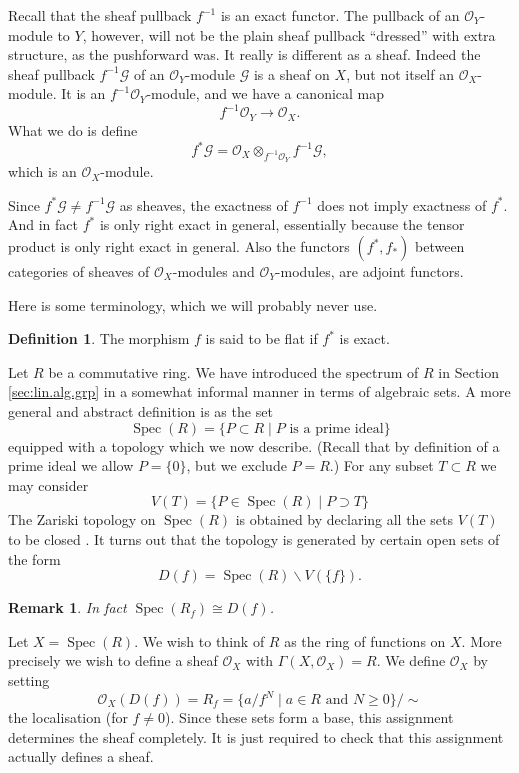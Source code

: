\documentclass[12pt]{article}
\theoremstyle{plain}
\newtheorem{rem}[thm]{Remark}
\theoremstyle{definition}
\newtheorem{defn}{Definition}[section]
\numberwithin{equation}{section}
\DeclareMathOperator{\spec}{Spec}
\newcommand{\CG}{\mathcal{G}}
\newcommand{\OO}{\mathcal{O}}
\begin{document}
Recall that the sheaf pullback $f^{-1}$ is an exact functor. The pullback of an $\OO_Y$-module to $Y$, however, will not be the plain sheaf pullback ``dressed'' with extra structure, as the pushforward was. It really is different as a sheaf. Indeed the sheaf pullback $f^{-1}\CG$ of an $\OO_Y$-module $\CG$ is a sheaf on $X$, but not itself an $\OO_X$-module. It is an $f^{-1}\OO_Y$-module, and we have a canonical map
\[
f^{-1}\OO_Y \rightarrow \OO_X.
\]
What we do is define
\[
f^*\CG = \OO_X \otimes_{f^{-1}\OO_Y} f^{-1}\CG,
\]
which is an $\OO_X$-module.

Since $f^*\CG \neq f^{-1}\CG$ as sheaves, the exactness of $f^{-1}$ does not imply exactness of $f^*$. And in fact $f^*$ is only right exact in general, essentially because the tensor product is only right exact in general. Also the functors $(f^*, f_*)$ between categories of sheaves of $\OO_X$-modules and $\OO_Y$-modules, are adjoint functors.

Here is some terminology, which we will probably never use.
\begin{defn}
The morphism $f$ is said to be flat if $f^*$ is exact.
\end{defn}


Let $R$ be a commutative ring. We have introduced the spectrum of $R$ in Section \ref{sec:lin.alg.grp} in a somewhat informal manner in terms of algebraic sets. A more general and abstract definition is as the set
\[
\spec(R) = \{P \subset R \mid \text{$P$ is a prime ideal}\}
\]
equipped with a topology which we now describe. (Recall that by definition of a prime ideal we allow $P = \{0\}$, but we exclude $P = R$.) For any subset $T \subset R$ we may consider
\[
V(T) = \{P \in \spec(R) \mid \text{$P \supset T$}\}
\]
The Zariski topology on $\spec(R)$ is obtained by declaring all the sets $V(T)$ to be closed {\cite[10.17]{stacks-project}}. It turns out that the topology is generated by certain open sets of the form
\[
D(f) = \spec(R) \backslash V(\{f\}).
\]
\begin{rem}
In fact $\spec(R_f) \cong D(f)$.
\end{rem}
Let $X = \spec(R)$. We wish to think of $R$ as the ring of functions on $X$. More precisely we wish to define a sheaf $\OO_X$ with $\Gamma(X, \OO_X) = R$. We define $\OO_X$ by setting
\[
\OO_X(D(f)) = R_f = \{a / f^N \mid \text{$a \in R$ and $N \geq 0$}\} / \sim
\]
the localisation (for $f \neq 0$). Since these sets form a base, this assignment determines the sheaf completely. It is just required to check that this assignment actually defines a sheaf.
\end{document}
